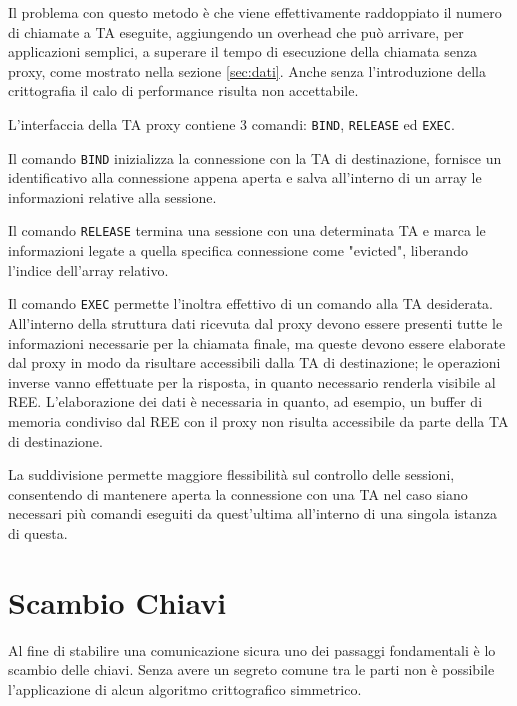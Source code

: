 \documentclass[12pt,italian]{report}
\begin{document}
	\bigbreak
	
	Il problema con questo metodo è che viene effettivamente raddoppiato il numero di chiamate a TA eseguite, aggiungendo un overhead che può arrivare, per applicazioni semplici, a superare il tempo di esecuzione della chiamata senza proxy, come mostrato nella sezione \ref{sec:dati}. Anche senza l'introduzione della crittografia il calo di performance risulta non accettabile.
	
	\bigbreak
	
	L'interfaccia della TA proxy contiene 3 comandi: \texttt{BIND}, \texttt{RELEASE} ed \texttt{EXEC}.
	
	Il comando \texttt{BIND} inizializza la connessione con la TA di destinazione, fornisce un identificativo alla connessione appena aperta e salva all'interno di un array le informazioni relative alla sessione.
	
	Il comando \texttt{RELEASE} termina una sessione con una determinata TA e marca le informazioni legate a quella specifica connessione come "evicted", liberando l'indice dell'array relativo.  
	
	Il comando \texttt{EXEC} permette l'inoltra effettivo di un comando alla TA desiderata. All'interno della struttura dati ricevuta dal proxy devono essere presenti tutte le informazioni necessarie per la chiamata finale, ma queste devono essere elaborate dal proxy in modo da risultare accessibili dalla TA di destinazione; le operazioni inverse vanno effettuate per la risposta, in quanto necessario renderla visibile al REE. L'elaborazione dei dati è necessaria in quanto, ad esempio, un buffer di memoria condiviso dal REE con il proxy non risulta accessibile da parte della TA di destinazione. 
	
	La suddivisione permette maggiore flessibilità sul controllo delle sessioni, consentendo di mantenere aperta la connessione con una TA nel caso siano necessari più comandi eseguiti da quest'ultima all'interno di una singola istanza di questa.
	
	
	
	\newpage
	
	\section{Scambio Chiavi}
	\label{sec:scambio_chiavi}
	Al fine di stabilire una comunicazione sicura uno dei passaggi fondamentali è lo scambio delle chiavi. Senza avere un segreto comune tra le parti non è possibile l'applicazione di alcun algoritmo crittografico simmetrico.
	
\end{document}
